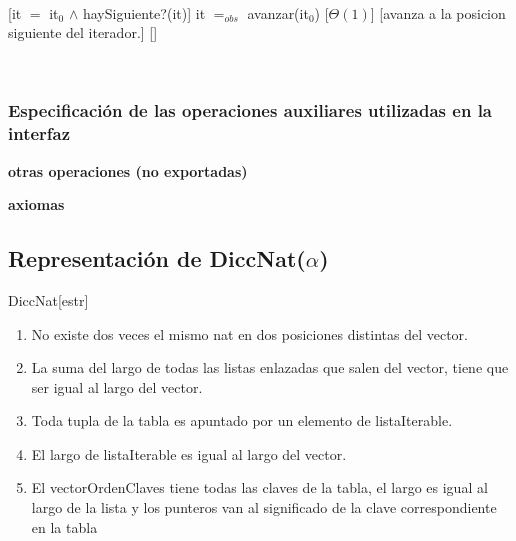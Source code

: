 ~

[it $=$ it$_0$ $\land$ haySiguiente?(it)]
{it $=_{obs}$ avanzar(it$_0$)}
[$\Theta(1)$]
[avanza a la posicion siguiente del iterador.]
[]

~

\subsubsection{Especificación de las operaciones auxiliares utilizadas en la interfaz}

\begin{tad}{}
	\textbf{otras operaciones (no exportadas)}


	\textbf{axiomas}

\end{tad}

\pagebreak

\subsection{Representación de DiccNat($\alpha$)}

\begin{Estructura}{DiccNat}[estr]
	\begin{Tupla}[estr]
	\end{Tupla}
\end{Estructura}

\begin{enumerate}
	\item No existe dos veces el mismo nat en dos posiciones distintas del vector.
	\item La suma del largo de todas las listas enlazadas que salen del vector, tiene que ser igual al largo del vector.
	\item Toda tupla de la tabla es apuntado por un elemento de listaIterable.
	\item El largo de listaIterable es igual al largo del vector.
	\item El vectorOrdenClaves tiene todas las claves de la tabla, el largo es igual al largo de la lista y los punteros van al significado de la clave correspondiente en la tabla
\end{enumerate}


